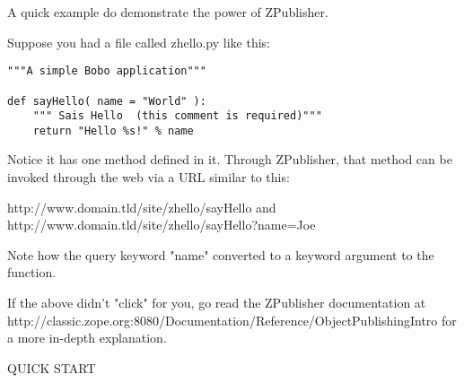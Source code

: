 A quick example do demonstrate the power of ZPublisher.

Suppose you had a file called zhello.py like this:

\begin{verbatim}
"""A simple Bobo application"""

def sayHello( name = "World" ):
    """ Sais Hello  (this comment is required)"""
    return "Hello %s!" % name
\end{verbatim}

Notice it has one method defined in it. Through ZPublisher, that
method can be invoked through the web via a URL similar to this:

http://www.domain.tld/site/zhello/sayHello and \\
http://www.domain.tld/site/zhello/sayHello?name=Joe

Note how the query keyword "name" converted to a keyword argument to
the function.

If the above didn't "click" for you, go read the ZPublisher
documentation at
http://classic.zope.org:8080/Documentation/Reference/ObjectPublishingIntro
for a more in-depth explanation.

QUICK START

